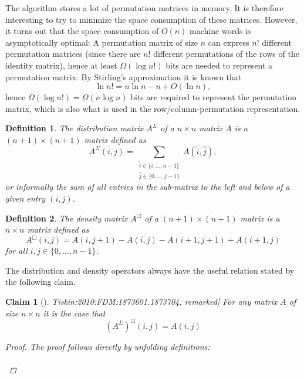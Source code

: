 \documentclass[twoside,11pt,openright]{report}
\newcommand{\reftiskin}[2]{\cite[#1]{Tiskin:2010:FDM:1873601.1873704}, #2}
\newtheorem{mydef}{Definition}
\newtheorem{claim}{Claim}
\begin{document}
The algorithm stores a lot of permutation matrices in memory. It is therefore interesting to try to minimize the space consumption of these matrices. However, it turns out that the space consumption of $O(n)$ machine words is asymptotically optimal: A permutation matrix of size $n$ can express $n!$ different permutation matrices (since there are $n!$ different permutations of the rows of the identity matrix), hence at least $\Omega(\log{n!})$ bits are needed to represent a permutation matrix. By Stirling's approximation it is known that
\[
  \ln{n!} = n \ln{n} - n + O(\ln{n}),
\]
hence $\Omega(\log{n!}) = \Omega(n \log{n})$ bits are required to represent the permutation matrix, which is also what is used in the row/column-permutation representation.
%
\begin{mydef}
  The distribution matrix $A^{\Sigma}$ of a $n \times n$ matrix $A$ is a $(n + 1) \times (n + 1)$ matrix defined as
  \[
    A^{\Sigma}(i, j) = \sum_{\substack{\hat{i} \in \{i, \dots, n - 1\} \\ \hat{j} \in \{0, \dots, j - 1\}}} {A(\hat{i}, \hat{j})},
  \]
  or informally the sum of all entries in the sub-matrix to the left and below of a given entry $(i, j)$.
\end{mydef}
%
\begin{mydef}
  The density matrix $A^{\Box}$ of a $(n + 1) \times (n + 1)$ matrix is a $n \times n$ matrix defined as
  \[
    A^{\Box}(i, j) = A(i, j + 1) - A(i, j) - A(i + 1, j + 1) + A(i + 1, j)
  \]
  for all $i, j \in \{ 0, \dots, n - 1 \}$.
\end{mydef}%
The distribution and density operators always have the useful relation stated by the following claim.
\begin{claim}[\reftiskin{p. 1288}{remarked}]
  \label{claim:sigma-box-identity}
  For any matrix $A$ of size $n \times n$ it is the case that
  \[
    (A^{\Sigma})^{\Box}(i, j) = A(i, j)
  \]
  \begin{proof}
    The proof follows directly by unfolding definitions:\\
    \\
  \end{proof}
\end{claim}
\end{document}
